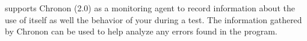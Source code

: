 \app{} supports Chronon (2.0) as a monitoring agent to record information about the use of \app{} itself as well the behavior of your \gdaut{} during a test. 
The information gathered by Chronon can be used to help analyze any errors found in the program. 

